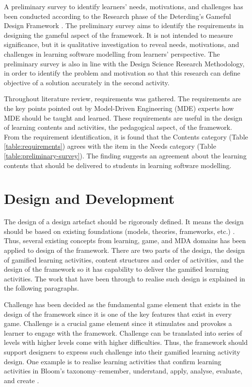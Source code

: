 \documentclass[12pt, a4paper]{report} \usepackage[titletoc]{appendix}
\begin{document}
A preliminary survey to identify learners' needs, motivations, and challenges has been conducted according to the Research phase of the Deterding's Gameful Design Framework \cite{deterding2015lens}. The preliminary survey aims to identify the requirements in designing the gameful aspect of the framework. It is not intended to measure significance, but it is qualitative investigation to reveal needs, motivations, and challenges in learning software modelling from learners' perspective. The preliminary survey is also in line with the Design Science Research Methodology, in order to identify the problem and motivation so that this research can define objective of a solution accurately in the second activity.

Throughout literature review, requirements was gathered. The requirements are the key points pointed out by Model-Driven Engineering (MDE) experts how MDE should be taught and learned. These requirements are useful in the design of learning contents and activities, the pedagogical aspect, of the framework. From the requirement identification, it is found that the Contents category (Table \ref{table:requirements}) agrees with the item in the Needs category (Table \ref{table:preliminary-survey}). The finding suggests an agreement about the learning contents that should be delivered to students in learning software modelling.

\section{Design and Development}
The design of a design artefact should be rigorously defined. It means the design should be based on existing foundations (models, theories, frameworks, etc.) \cite{von2004design}. Thus, several existing concepts from learning, game, and MDA domains has been applied to design of the framework. There are two parts of the design, the design of gamified learning activities, content structures and order of activities, and the design of the framework so it has capability to deliver the gamified learning activities. The work that have been through to realise such design is explained in the following paragraphs. 

Challenge has been decided as the fundamental game element that exists in the design of the framework since it is one of the key features that exist in every game. Challenge is a crucial game element since it stimulates and provokes a learner to engage with the framework. Challenge can be translated into series of levels with higher levels come with higher difficulties. Thus, the framework should support designers to express such challenge into their gamified learning activity design. One example is to realise learning activities that confirm learning activities in Bloom's taxonomy--remember, understand, apply, analyse, evaluate, and create \cite{krathwohl2002revision}.
\end{document}
